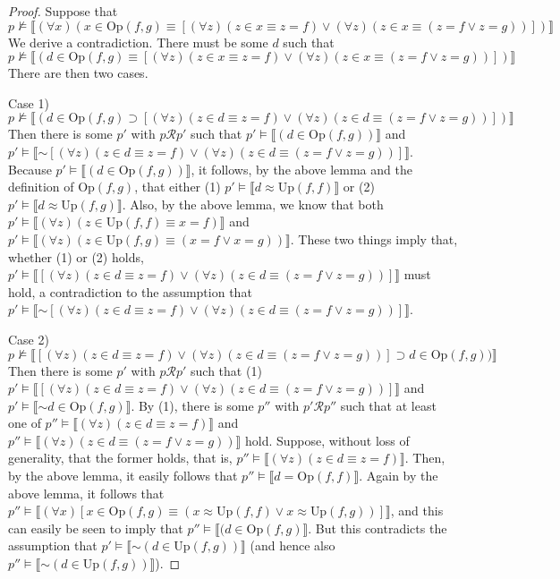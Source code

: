 \documentclass{article}
\newcommand*{\oldneg}{\mathord{\sim}}
\newcommand{\lbc}{\llbracket}
\newcommand{\rbc}{\rrbracket}
\theoremstyle{definition}
\begin{document}
\begin{proof}
Suppose that
\[ p\nvDash\lbc(\forall x)(x\in\textrm{Op}(f,g)\equiv[(\forall z)(z\in x\equiv z=f)\vee(\forall z)(z\in x\equiv (z=f\vee z=g))])\rbc \]
We derive a contradiction. There must be some $d$ such that 
\[ p\nvDash\lbc(d\in\textrm{Op}(f,g)\equiv[(\forall z)(z\in x\equiv z=f)\vee(\forall z)(z\in x\equiv (z=f\vee z=g))])\rbc \]
There are then two cases.

Case 1) \[ p\nvDash\lbc(d\in\textrm{Op}(f,g)\supset[(\forall z)(z\in d\equiv z=f)\vee(\forall z)(z\in d\equiv (z=f\vee z=g))])\rbc \]
Then there is some $p'$ with $p\mathcal{R}p'$ such that 
$p'\vDash\lbc (d\in\textrm{Op}(f,g))\rbc$ and $p'\vDash\lbc\oldneg[(\forall z)(z\in d\equiv z=f)\vee(\forall z)(z\in d\equiv (z=f\vee z=g))]\rbc$.
Because $p'\vDash\lbc (d\in\textrm{Op}(f,g))\rbc$, it follows, by the above lemma and the definition of 
$\textrm{Op}(f,g)$, that either (1) $p'\vDash\lbc d\approx\textrm{Up}(f,f)\rbc$ or 
(2) $p'\vDash\lbc d\approx\textrm{Up}(f,g)\rbc$. Also, by the above lemma, we know that both 
$p'\vDash\lbc (\forall z)(z\in\textrm{Up}(f,f)\equiv x=f)\rbc$ and 
$p'\vDash\lbc (\forall z)(z\in\textrm{Up}(f,g)\equiv (x=f\vee x=g))\rbc$. These two things imply that, whether (1) or (2) holds,
$p'\vDash\lbc [(\forall z)(z\in d\equiv z=f)\vee(\forall z)(z\in d\equiv (z=f\vee z=g))]\rbc$ must hold, a contradiction to the assumption that 
$p'\vDash\lbc\oldneg[(\forall z)(z\in d\equiv z=f)\vee(\forall z)(z\in d\equiv (z=f\vee z=g))]\rbc$. 

Case 2) \[ p\nvDash\lbc[(\forall z)(z\in d\equiv z=f)\vee(\forall z)(z\in d\equiv (z=f\vee z=g))]\supset d\in\textrm{Op}(f,g))\rbc \] 
Then there is some $p'$ with $p\mathcal{R}p'$ such that
(1) $p'\vDash\lbc [(\forall z)(z\in d\equiv z=f)\vee(\forall z)(z\in d\equiv (z=f\vee z=g))]\rbc$ and 
$p'\vDash\lbc\oldneg d\in\textrm{Op}(f,g)\rbc$. By (1), there is some $p''$ with $p'\mathcal{R}p''$ such that at least one of 
$p''\vDash\lbc(\forall z)(z\in d\equiv z=f)\rbc$ and $p''\vDash\lbc(\forall z)(z\in d\equiv(z=f\vee z=g))\rbc$ hold. Suppose, without loss of generality, that 
the former holds, that is, $p''\vDash\lbc(\forall z)(z\in d\equiv z=f)\rbc$. Then, by the above lemma, it easily follows that 
$p''\vDash\lbc d=\textrm{Op}(f,f)\rbc$. Again by the above lemma, it follows that 
$p''\vDash\lbc (\forall x)[x\in\textrm{Op}(f,g)\equiv (x\approx\textrm{Up}(f,f)\vee x\approx\textrm{Up}(f,g))]\rbc$, and this can easily be seen to imply 
that $p''\vDash\lbc (d\in\textrm{Op}(f,g)\rbc$. But this contradicts the assumption that $p'\vDash\lbc\oldneg(d\in\textrm{Up}(f,g))\rbc$
(and hence also $p''\vDash\lbc\oldneg(d\in\textrm{Up}(f,g))\rbc$).

\end{proof}
\end{document}
